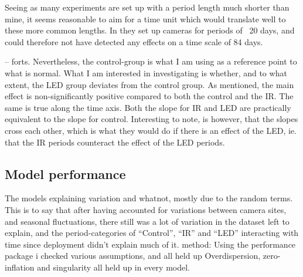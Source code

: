 Seeing as many experiments are set up with a period length much shorter than mine, it seems reasonable to aim for a time unit which would translate well to these more common lengths. In \cite{Heinrich2020} they set up cameras for periods of ~20 days,%
and could therefore not have detected any effects on a time scale of 84 days.


		-- forts. %
Nevertheless, the control-group is what I am using as a reference point to what is normal. What I am interested in investigating is whether, and to what extent, the LED group deviates from the control group.
As mentioned, the main effect is non-significantly positive compared to both the control and the IR. The same is true along the time axis. Both the slope for IR and LED are practically equivalent to the slope for control. Interesting to note, is however, that the slopes cross each other, which is what they would do if there is an effect of the LED, ie. that the IR periods counteract the effect of the LED periods.

\subsection{Model performance} %
The models explaining variation and whatnot, mostly due to the random terms. This is to say that after having accounted for variations between camera sites, and seasonal fluctuations, there still was a lot of variation in the dataset left to explain, and the period-categories of “Control”, “IR” and “LED” interacting with time since deployment didn’t explain much of it.
method:
Using the performance package i checked various assumptions, and all held up Overdispersion, zero-inflation and singularity all held up in every model.

